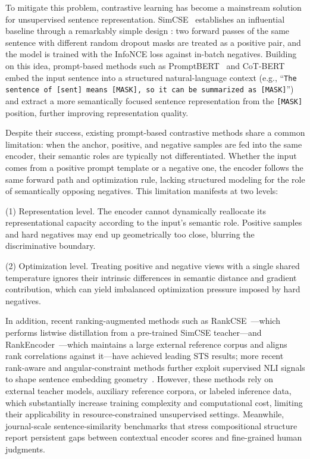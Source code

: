 \documentclass[a4paper,fleqn]{cas-dc}
\begin{document}
To mitigate this problem, contrastive learning has become a mainstream solution for unsupervised sentence representation.
SimCSE~\cite{simcse} establishes an influential baseline through a remarkably simple design : two forward passes of the same sentence with different random dropout masks are treated as a positive pair, and the model is trained with the InfoNCE loss against in-batch negatives. Building on this idea, prompt-based methods such as PromptBERT~\cite{promptbert} and CoT-BERT~\cite{cotbert} embed the input sentence into a structured natural-language context (e.g., ``\texttt{The sentence of [sent] means [MASK], so it can be summarized as [MASK]}'') and extract a more semantically focused sentence representation from the \texttt{[MASK]} position, further improving representation quality.

Despite their success, existing prompt-based contrastive methods share a common limitation: when the anchor, positive, and negative samples are fed into the same encoder, their semantic roles are typically not differentiated. Whether the input comes from a positive prompt template or a negative one, the encoder follows the same forward path and optimization rule, lacking structured modeling for the role of semantically opposing negatives. This limitation manifests at two levels:

(1) Representation level. The encoder cannot dynamically reallocate its representational capacity according to the input's semantic role. Positive samples and hard negatives may end up geometrically too close, blurring the discriminative boundary.

(2) Optimization level. Treating positive and negative views with a single shared temperature ignores their intrinsic differences in semantic distance and gradient contribution, which can yield imbalanced optimization pressure imposed by hard negatives.

In addition, recent ranking-augmented methods such as RankCSE~\cite{rankcse}---which performs listwise distillation from a pre-trained SimCSE teacher---and RankEncoder~\cite{rankencoder}---which maintains a large external reference corpus and aligns rank correlations against it---have achieved leading STS results; more recent rank-aware and angular-constraint methods further exploit supervised NLI signals to shape sentence embedding geometry~\cite{raoe}. However, these methods rely on external teacher models, auxiliary reference corpora, or labeled inference data, which substantially increase training complexity and computational cost, limiting their applicability in resource-constrained unsupervised settings.
Meanwhile, journal-scale sentence-similarity benchmarks that stress compositional structure report persistent gaps between contextual encoder scores and fine-grained human judgments.
\end{document}
